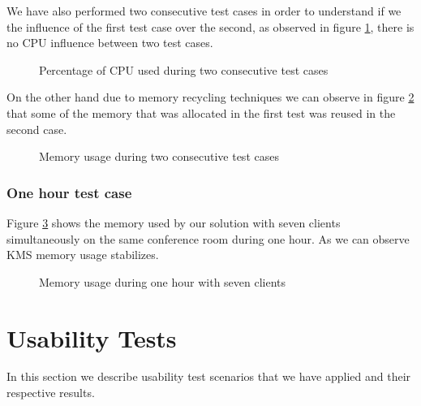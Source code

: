 We have also performed two consecutive test cases in order to understand if we the influence of the first test case over the second, as observed in figure \ref{fig:test_two_times_cpu}, there is no \ac{CPU} influence between two test cases.

  \begin{figure}[!htb]
  \begin{center}
    
  \end{center}
  \caption{Percentage of CPU used during two consecutive test cases}
  \label{fig:test_two_times_cpu}
\end{figure}

On the other hand due to memory recycling techniques we can observe in figure \ref{fig:test_two_times_mem} that some of the memory that was allocated in the first test was reused in the second case.

\begin{figure}[!htb]
  \begin{center}
    
  \end{center}
  \caption{Memory usage during two consecutive test cases}
  \label{fig:test_two_times_mem}
\end{figure}

\subsubsection{One hour test case}


   Figure \ref{fig:test_hour_mem} shows the memory used by our solution with seven clients simultaneously on the same conference room during one hour. As we can observe \ac{KMS} memory usage stabilizes.


  \begin{figure}[!htb]
  \begin{center}
    
  \end{center}
  \caption{Memory usage during one hour with seven clients}
  \label{fig:test_hour_mem}
\end{figure}





\section {Usability Tests}
     In this section we describe usability test scenarios that we have applied and their respective results.


